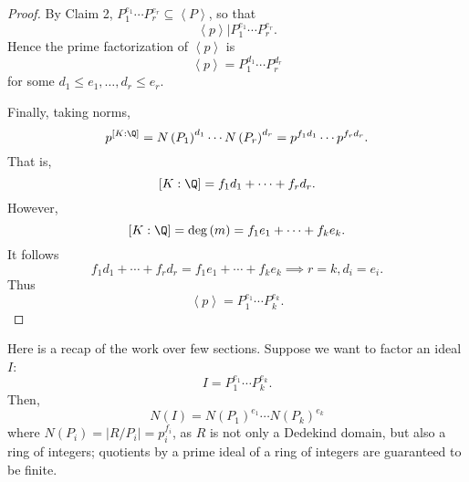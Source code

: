 \documentclass[pmath441]{subfiles}
\begin{document}
\begin{proof}
        By Claim 2, $P_1^{e_1}\cdots P_r^{e_r}\subseteq \left< P \right>$, so that 
        \begin{equation*}
            \left< p \right> | P_1^{e_1}\cdots P_r^{e_r} .
        \end{equation*}
        Hence the prime factorization of $\left< p \right>$ is  
        \begin{equation*}
            \left< p \right> = P_1^{d_1}\cdots P_r^{d_r} 
        \end{equation*}
        for some $d_1\leq e_1, \ldots, d_r\leq e_r$.

        Finally, taking norms,
        \begin{equation*}
            p^{\left[ K:\Q \right]} = N\left( P_1 \right)^{d_1}\cdots N\left( P_r \right)^{d_r} = p^{f_1d_1}\cdots p^{f_rd_r}.
        \end{equation*}
        That is,
        \begin{equation*}
            \left[ K:\Q \right] = f_1d_1+\cdots+f_rd_r.
        \end{equation*}
        However,
        \begin{equation*}
            \left[ K:\Q \right] = \deg\left( m \right) = f_1e_1+\cdots+f_ke_k.
        \end{equation*}
        It follows
        \begin{equation*}
            f_1d_1+\cdots+f_rd_r=f_1e_1+\cdots+f_ke_k \implies r=k, d_i = e_i.
        \end{equation*}
        Thus
        \begin{equation*}
            \left< p \right> = P_1^{e_1}\cdots P_k^{e_k}. 
        \end{equation*}
    \end{proof}
    
    \np Here is a recap of the work over few sections. Suppose we want to factor an ideal $I$:
    \begin{equation*}
        I = P_1^{e_1}\cdots P_k^{e_k}.
    \end{equation*}
    Then,
    \begin{equation*}
        N\left( I \right) = N\left( P_1 \right)^{e_1}\cdots N\left( P_k \right)^{e_k}
    \end{equation*}
    where $N\left( P_i \right) = \left| R /P_i \right| = p_i^{f_i}$, as $R$ is not only a Dedekind domain, but also a ring of integers; quotients by a prime ideal of a ring of integers are guaranteed to be finite.
\end{document}
